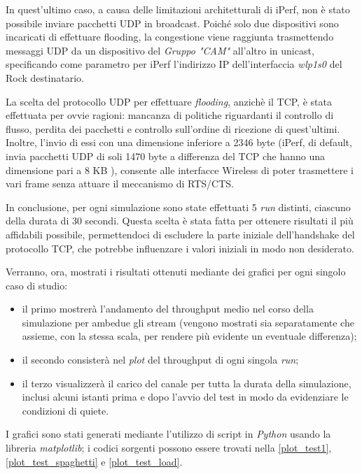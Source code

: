 In quest'ultimo caso, a causa delle limitazioni architetturali di iPerf, non è stato possibile inviare pacchetti UDP in broadcast. Poiché solo due dispositivi sono incaricati di effettuare flooding, la congestione viene raggiunta trasmettendo messaggi UDP da un dispositivo del \textit{Gruppo "CAM"} all'altro in unicast, specificando come parametro per iPerf l'indirizzo IP dell'interfaccia \textit{wlp1s0} del Rock destinatario.

La scelta del protocollo UDP per effettuare \textit{flooding}, anzichè il TCP, è stata effettuata per ovvie ragioni: mancanza di politiche riguardanti il controllo di flusso, perdita dei pacchetti e controllo sull'ordine di ricezione di quest'ultimi. Inoltre, l'invio di essi con una dimensione inferiore a 2346 byte (iPerf, di default, invia pacchetti UDP di soli 1470 byte a differenza del TCP che hanno una dimensione pari a 8 KB \cite{iperf}), consente alle interfacce Wireless di poter trasmettere i vari frame senza attuare il meccanismo di RTS/CTS.

In conclusione, per ogni simulazione sono state effettuati 5 \textit{run} distinti, ciascuno della durata di 30 secondi. Questa scelta è stata fatta per ottenere risultati il più affidabili possibile, permettendoci di escludere la parte iniziale dell'handshake del protocollo TCP, che potrebbe influenzare i valori iniziali in modo non desiderato.

Verranno, ora, mostrati i risultati ottenuti mediante dei grafici per ogni singolo caso di studio:

\begin{itemize}
    \item il primo mostrerà l'andamento del throughput medio nel corso della simulazione per ambedue gli stream (vengono mostrati sia separatamente che assieme, con la stessa scala, per rendere più evidente un eventuale differenza);
    \item il secondo consisterà nel \textit{plot} del throughput di ogni singola \textit{run};
    \item il terzo visualizzerà il carico del canale per tutta la durata della simulazione, inclusi alcuni istanti prima e dopo l'avvio del test in modo da evidenziare le condizioni di quiete.
\end{itemize}

\noindent I grafici sono stati generati mediante l'utilizzo di script in \textit{Python} usando la libreria \textit{matplotlib}; i codici sorgenti possono essere trovati nella \autoref{plot_test1}, \autoref{plot_test_spaghetti} e \autoref{plot_test_load}.

